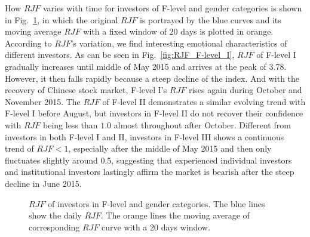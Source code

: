 \documentclass[aps,preprint,groupedaddress]{revtex4-1}
\begin{document}
How $RJF$ varies with time for investors of F-level and gender categories is shown in Fig.~\ref{fig:RJF}, in which the original $RJF$ is portrayed by the blue curves and its moving average $RJF$ with a fixed window of $20$ days is plotted in orange. According to $RJF$'s variation, we find interesting emotional characteristics of different investors. As can be seen in Fig.~\ref{fig:RJF_F-level_I}, $RJF$ of F-level I gradually increases until middle of May 2015 and arrives at the peak of 3.78. However, it then falls rapidly because a steep decline of the index. And with the recovery of Chinese stock market, F-level I's $RJF$ rises again during October and November 2015. The $RJF$ of F-level II demonstrates a similar evolving trend with F-level I before August, but investors in F-level II do not recover their confidence with $RJF$ being less than $1.0$ almost throughout after October. Different from investors in both F-level I and II, investors in F-level III shows a continuous trend of $RJF<1$, especially after the middle of May 2015 and then only fluctuates slightly around 0.5, suggesting that experienced individual investors and institutional investors lastingly affirm the market is bearish after the steep decline in June 2015. 

\begin{figure}
\centering
{}
\hfil
{}
\hfil
{}
\hfil
{}
\hfil
{}
\caption{$RJF$ of investors in F-level and gender categories. The blue lines show the daily $RJF$. The orange lines {\color{black}{show}} the moving average of corresponding $RJF$ curve with a 20 days window.}
\label{fig:RJF}
\end{figure}
\end{document}
